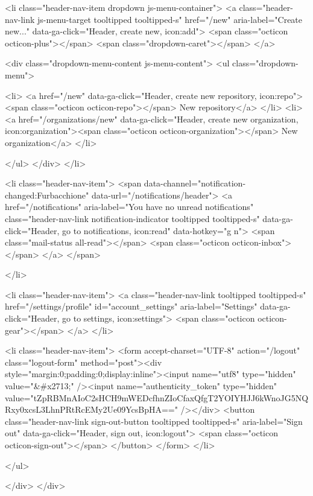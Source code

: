   <li class="header-nav-item dropdown js-menu-container">
    <a class="header-nav-link js-menu-target tooltipped tooltipped-s" href="/new" aria-label="Create new..." data-ga-click="Header, create new, icon:add">
      <span class="octicon octicon-plus"></span>
      <span class="dropdown-caret"></span>
    </a>

    <div class="dropdown-menu-content js-menu-content">
      <ul class="dropdown-menu">
        
<li>
  <a href="/new" data-ga-click="Header, create new repository, icon:repo"><span class="octicon octicon-repo"></span> New repository</a>
</li>
<li>
  <a href="/organizations/new" data-ga-click="Header, create new organization, icon:organization"><span class="octicon octicon-organization"></span> New organization</a>
</li>



      </ul>
    </div>
  </li>

  <li class="header-nav-item">
      <span 
        data-channel="notification-changed:Furbacchione"
        data-url="/notifications/header">
      <a href="/notifications" aria-label="You have no unread notifications" class="header-nav-link notification-indicator tooltipped tooltipped-s" data-ga-click="Header, go to notifications, icon:read" data-hotkey="g n">
          <span class="mail-status all-read"></span>
          <span class="octicon octicon-inbox"></span>
</a>  </span>

  </li>

  <li class="header-nav-item">
    <a class="header-nav-link tooltipped tooltipped-s" href="/settings/profile" id="account_settings" aria-label="Settings" data-ga-click="Header, go to settings, icon:settings">
      <span class="octicon octicon-gear"></span>
    </a>
  </li>

  <li class="header-nav-item">
    <form accept-charset="UTF-8" action="/logout" class="logout-form" method="post"><div style="margin:0;padding:0;display:inline"><input name="utf8" type="hidden" value="&#x2713;" /><input name="authenticity_token" type="hidden" value="tZpRBMnAIoC2sHCH9mWEDcfhnZIoCfaxQfgT2YOIYHJJ6kWnoJG5NQRxy0xcsL3LhnPRtRcEMy2Ue09YcsBpHA==" /></div>
      <button class="header-nav-link sign-out-button tooltipped tooltipped-s" aria-label="Sign out" data-ga-click="Header, sign out, icon:logout">
        <span class="octicon octicon-sign-out"></span>
      </button>
</form>  </li>

</ul>



    
  </div>
</div>


